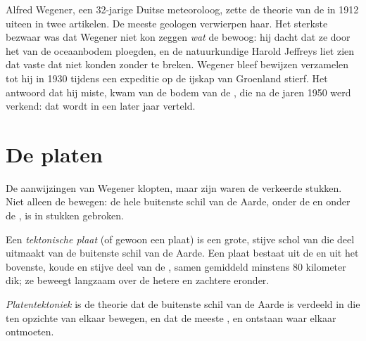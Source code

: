 \begin{history}
Alfred Wegener, een 32-jarige Duitse meteoroloog, zette de theorie van de
 in 1912 uiteen in twee artikelen. De meeste geologen
verwierpen haar. Het sterkste bezwaar was dat Wegener niet kon zeggen
\emph{wat} de  bewoog: hij dacht dat ze door het  van
de oceaanbodem ploegden, en de natuurkundige Harold Jeffreys liet zien dat
vaste  dat niet konden zonder te breken. Wegener bleef bewijzen
verzamelen tot hij in 1930 tijdens een expeditie op de ijskap van Groenland
stierf. Het antwoord dat hij miste, kwam van de bodem van de , die
na de jaren 1950 werd verkend: dat wordt in een later jaar verteld.
\end{history}

\section{De platen}

De aanwijzingen van Wegener klopten, maar zijn  waren de
verkeerde stukken. Niet alleen de  bewegen: de hele buitenste
schil van de Aarde, onder de  en onder de , is in stukken
gebroken.

\begin{definition}\label{def:g7:plate-tectonics:plate}
Een \emph{tektonische plaat} (of gewoon een plaat)
is een grote, stijve schol van  die deel uitmaakt van de buitenste
schil van de Aarde. Een plaat bestaat uit de  en uit het
bovenste, koude en stijve deel van de , samen gemiddeld minstens
80 kilometer dik; ze beweegt langzaam over de hetere en zachtere 
eronder.
\end{definition}

\begin{definition}[Platentektoniek]\label{def:g7:plate-tectonics:plate-tectonics}
\emph{Platentektoniek} is de theorie dat de buitenste
schil van de Aarde is verdeeld in  die ten opzichte van elkaar
bewegen, en dat de meeste ,  en  ontstaan waar
 elkaar ontmoeten.
\end{definition}

